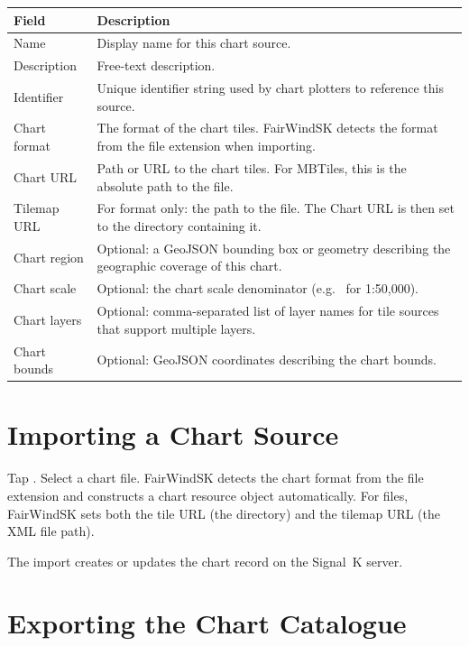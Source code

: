 \begin{longtable}{L{3cm} L{10.7cm}}
\toprule
{}
{\sffamily\bfseries\color{white} Field} &
{\sffamily\bfseries\color{white} Description} \\
\midrule
Name & Display name for this chart source. \\
Description & Free-text description. \\
Identifier & Unique identifier string used by chart plotters to reference this source. \\
Chart format & The format of the chart tiles. FairWindSK detects the format from the file extension when importing. \\
Chart URL & Path or URL to the chart tiles. For MBTiles, this is the absolute path to the  file. \\
Tilemap URL & For  format only: the path to the  file. The Chart URL is then set to the directory containing it. \\
Chart region & Optional: a GeoJSON bounding box or geometry describing the geographic coverage of this chart. \\
Chart scale & Optional: the chart scale denominator (e.g.\  for 1:50,000). \\
Chart layers & Optional: comma-separated list of layer names for tile sources that support multiple layers. \\
Chart bounds & Optional: GeoJSON coordinates describing the chart bounds. \\
\bottomrule
\end{longtable}

\section{Importing a Chart Source}

Tap . Select a chart file.
FairWindSK detects the chart format from the file extension and constructs a chart resource object
automatically.
For  files, FairWindSK sets both the tile URL (the directory) and the
tilemap URL (the XML file path).

The import creates or updates the chart record on the Signal~K server.

\section{Exporting the Chart Catalogue}

